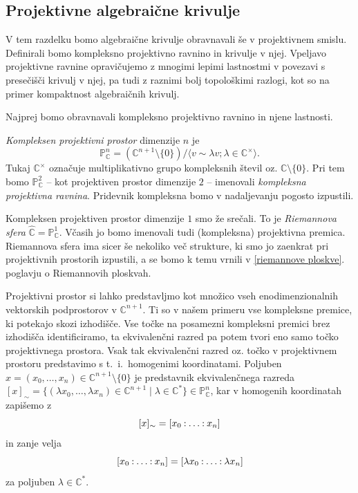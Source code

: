 \documentclass[mat1]{fmfdelo}
\numberwithin{equation}{section}
\newcommand{\C}{\mathbb C}
\newcommand{\PP}{\mathbb P}
\newcommand{\CM}{\mathbb C ^*}
\newcommand{\PC}{\mathbb{P}^2_\C}
\newcommand{\pcoor}[1]{%
\begingroup\lccode`~=`: \lowercase{\endgroup
\edef~}{\mathbin{\mathchar\the\mathcode`:}\nobreak}%
\left[%
\begingroup
\mathcode`:=\string"8000
#1%
\endgroup
\right]%
}
\newcommand{\ti}{t.~i.\ }
\theoremstyle{definition}
\begin{document}
 

\subsection{Projektivne algebraične krivulje}

V tem razdelku bomo algebraične krivulje obravnavali še v projektivnem smislu. Definirali bomo kompleksno projektivno ravnino in krivulje v njej. Vpeljavo projektivne ravnine opravičujemo z mnogimi lepimi lastnostmi v povezavi s presečišči krivulj v njej, pa tudi z raznimi bolj topološkimi razlogi, kot so na primer kompaktnost algebraičnih krivulj.

Najprej bomo obravnavali kompleksno projektivno ravnino in njene lastnosti. 
\begin{definicija}
    \emph{Kompleksen projektivni prostor} dimenzije $n$ je 
    \[
        \mathbb{P}^n_\C = (\C^{n+1} \setminus \{0 \}) / \langle v \sim \lambda v; \lambda \in \C^{\times} \rangle.
    \]
    Tukaj $\C^{\times}$ označuje multiplikativno grupo kompleksnih števil oz. $\C \setminus \{0 \}$. 
    Pri tem bomo $\PC$ -- kot projektiven prostor dimenzije $2$ -- imenovali \emph{kompleksna projektivna ravnina}. Pridevnik kompleksna bomo v nadaljevanju pogosto izpustili.
\end{definicija}

\begin{primer*}
    Kompleksen projektiven prostor dimenzije $1$ smo že srečali. To je \emph{Riemannova sfera} $\widehat{\C} = \mathbb{P}^1_\C$. Včasih jo bomo imenovali tudi (kompleksna) projektivna premica. Riemannova sfera ima sicer še nekoliko več strukture, ki smo jo zaenkrat pri projektivnih prostorih izpustili, a se bomo k temu vrnili v \ref{riemannove ploskve}. poglavju o Riemannovih ploskvah.
\end{primer*}

Projektivni prostor si lahko predstavljmo kot množico vseh enodimenzionalnih vektorskih podprostorov v $\C^{n+1}$. Ti so v našem primeru vse kompleksne premice, ki potekajo skozi izhodišče. Vse točke na posamezni kompleksni premici brez izhodišča identificiramo, ta ekvivalenčni razred pa potem tvori eno samo točko projektivnega prostora. Vsak tak ekvivalenčni razred oz. točko v projektivnem prostoru predstavimo s \ti homogenimi koordinatami. Poljuben $x = (x_0, \dots, x_n) \in \C^{n+1}\setminus \{0\}$ je predstavnik ekvivalenčnega razreda $[x]_\sim = \{(\lambda x_0, \dots, \lambda x_n) \in \C^{n+1} \mid \lambda \in \CM\} \in \PP^n_\C$, kar v homogenih koordinatah zapišemo z
    \[
        [x]_\sim = \pcoor{x_0 : \ldots : x_n}
    \]
in zanje velja
    \[
        \pcoor{x_0: \ldots: x_n} = \pcoor{\lambda x_0: \ldots: \lambda x_n}
    \]
za poljuben $\lambda \in \CM$.
\end{document}

